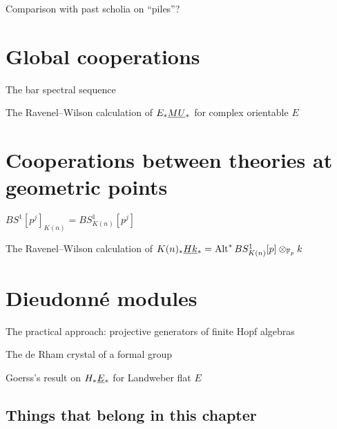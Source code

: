 Comparison with past scholia on ``piles''?








\section{Global cooperations}

The bar spectral sequence

The Ravenel--Wilson calculation of $E_* \smash{\underline{MU}}_{*}$ for complex orientable $E$





\section{Cooperations between theories at geometric points}


$BS^1[p^j]_{K(n)} = BS^1_{K(n)}[p^j]$

The Ravenel--Wilson calculation of $K(n)_* \smash{\underline{Hk}}_{*} = \operatorname{Alt}^* BS^1_{K(n)}[p] \otimes_{\mathbb F_p} k$



\section{Dieudonn\'e modules}

The practical approach: projective generators of finite Hopf algebras

The de Rham crystal of a formal group

Goerss's result on $H_* \smash{\underline{E}}_{*}$ for Landweber flat $E$





\subsection*{Things that belong in this chapter}

